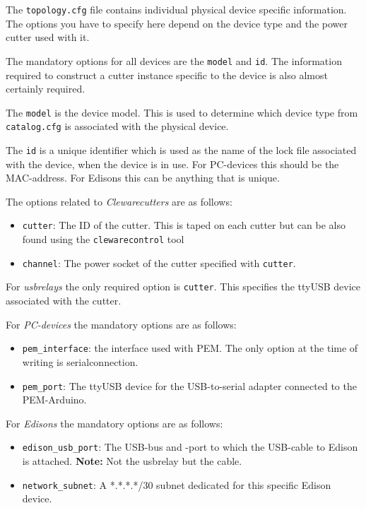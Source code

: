 \documentclass[a4paper,11pt]{article}
\newcommand{\note}{\textbf{Note: }}
\newcommand{\cmd}[1]{\texttt{#1}}
\begin{document}
The \cmd{topology.cfg} file contains individual physical device specific information. The options you have to specify here depend on the device type and the power cutter used with it.

The mandatory options for all devices are the \cmd{model} and \cmd{id}. The information required to construct a cutter instance specific to the device is also almost certainly required.

The \cmd{model} is the device model. This is used to determine which device type from \cmd{catalog.cfg} is associated with the physical device.

The \cmd{id} is a unique identifier which is used as the name of the lock file associated with the device, when the device is in use. For PC-devices this should be the MAC-address. For Edisons this can be anything that is unique.

The options related to \emph{Clewarecutters} are as follows:
\begin{itemize}
\item \cmd{cutter}: The ID of the cutter. This is taped on each cutter but can be also found using the \cmd{clewarecontrol} tool
\item \cmd{channel}: The power socket of the cutter specified with \cmd{cutter}.
\end{itemize}

For \emph{usbrelays} the only required option is \cmd{cutter}. This specifies the ttyUSB device associated with the cutter.

For \emph{PC-devices} the mandatory options are as follows:
\begin{itemize}
\item \cmd{pem\_interface}: the interface used with PEM. The only option at the time of writing is serialconnection.
\item \cmd{pem\_port}: The ttyUSB device for the USB-to-serial adapter connected to the PEM-Arduino.
\end{itemize}

For \emph{Edisons} the mandatory options are as follows:
\begin{itemize}
\item \cmd{edison\_usb\_port}: The USB-bus and -port to which the USB-cable to Edison is attached. \note Not the usbrelay but the cable.

\item \cmd{network\_subnet}: A *.*.*.*/30 subnet dedicated for this specific Edison device.
\end{itemize}
\end{document}
